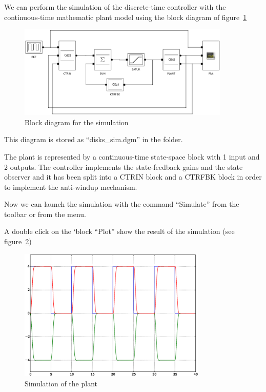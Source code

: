 We can perform the simulation of the discrete-time controller with the 
continuous-time mathematic plant model using the block diagram of 
figure~\ref{F21}

\begin{figure}[htbp]	%
\centering
\includegraphics[width=0.9\textwidth]{eps/diskssim.eps}
\caption{Block diagram for the simulation}
\label{F21}
\end{figure}

This diagram is stored as ``disks\_sim.dgm'' in the folder.

The plant is represented by a continuous-time state-space block with 1 input 
and 2 outputs.
The controller implements the state-feedback gains and the state observer 
and it has been split into a CTRIN block and a CTRFBK block in order to 
implement the anti-windup mechanism.

Now we can launch the simulation with the command ``Simulate'' from the toolbar 
or from the menu.

A double click on the `block ``Plot'' show the result of the simulation (see 
figure~\ref{F22})

\begin{figure}[htbp]	%
\centering
\includegraphics[width=0.8\textwidth]{eps/simout.eps}
\caption{Simulation of the plant}
\label{F22}
\end{figure}

